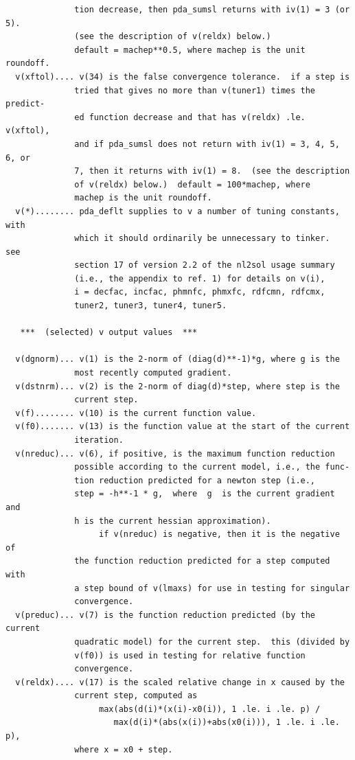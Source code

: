 \documentclass[11pt,twoside]{article}
\begin{document}
\begin{verbatim}
              tion decrease, then pda_sumsl returns with iv(1) = 3 (or 5).
              (see the description of v(reldx) below.)
              default = machep**0.5, where machep is the unit roundoff.
  v(xftol).... v(34) is the false convergence tolerance.  if a step is
              tried that gives no more than v(tuner1) times the predict-
              ed function decrease and that has v(reldx) .le. v(xftol),
              and if pda_sumsl does not return with iv(1) = 3, 4, 5, 6, or
              7, then it returns with iv(1) = 8.  (see the description
              of v(reldx) below.)  default = 100*machep, where
              machep is the unit roundoff.
  v(*)........ pda_deflt supplies to v a number of tuning constants, with
              which it should ordinarily be unnecessary to tinker.  see
              section 17 of version 2.2 of the nl2sol usage summary
              (i.e., the appendix to ref. 1) for details on v(i),
              i = decfac, incfac, phmnfc, phmxfc, rdfcmn, rdfcmx,
              tuner2, tuner3, tuner4, tuner5.
 
   ***  (selected) v output values  ***
 
  v(dgnorm)... v(1) is the 2-norm of (diag(d)**-1)*g, where g is the
              most recently computed gradient.
  v(dstnrm)... v(2) is the 2-norm of diag(d)*step, where step is the
              current step.
  v(f)........ v(10) is the current function value.
  v(f0)....... v(13) is the function value at the start of the current
              iteration.
  v(nreduc)... v(6), if positive, is the maximum function reduction
              possible according to the current model, i.e., the func-
              tion reduction predicted for a newton step (i.e.,
              step = -h**-1 * g,  where  g  is the current gradient and
              h is the current hessian approximation).
                   if v(nreduc) is negative, then it is the negative of
              the function reduction predicted for a step computed with
              a step bound of v(lmaxs) for use in testing for singular
              convergence.
  v(preduc)... v(7) is the function reduction predicted (by the current
              quadratic model) for the current step.  this (divided by
              v(f0)) is used in testing for relative function
              convergence.
  v(reldx).... v(17) is the scaled relative change in x caused by the
              current step, computed as
                   max(abs(d(i)*(x(i)-x0(i)), 1 .le. i .le. p) /
                      max(d(i)*(abs(x(i))+abs(x0(i))), 1 .le. i .le. p),
              where x = x0 + step.
 

\end{verbatim}
\end{document}
